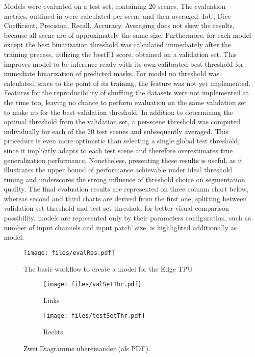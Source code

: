 {Models were evaluated on a test set, containing 20 scenes. The evaluation metrics, outlined in 
were calculated per scene and then averaged:
IoU, Dice Coefficient, Precision, Recall, Accuracy. Averaging does not skew the results, because all scene are of approximately the same size.
Furthermore, for each model except  the best binarization threshold was calculated immediately after the training precess,
utilizing the bestF1 score, obtained on a validation set.
This improves model to be inference-ready with its own calibrated best threshold for immediate binarization of predicted masks.
For  model no threshold was calculated, since to the point of its training, the feature was not yet implemented.
Features for the reproducibility of shuffling the datasets were not implemented at the time too,
leaving no chance to perform  evaluation on the same validation set to make up for the best validation threshold.
In addition to determining the optimal threshold from the validation set,
a per-scene threshold was computed individually for each of the 20 test scenes and subsequently averaged.
This procedure is even more optimistic than selecting a single global test threshold,
since it implicitly adapts to each test scene and therefore overestimates true generalization performance.
Nonetheless, presenting these results is useful, as it illustrates the upper bound of performance
achievable under ideal threshold tuning and underscores the strong influence of threshold choice on segmentation quality.
The final evaluation results are represented on three column chart below,
whereas second and third charts are derived from the first one, splitting between validation set threshold and test set threshold
for better visual comparison possibility.
 models are represented only by their parameters configuration, such as number of input channels and input patch' size,
 is highlighted additionally as  model. 

\begin{figure}[H]
  \centering
  \texttt{[image: files/evalRes.pdf]}
  \caption{The basic workflow to create a model for the Edge TPU}
  \label{fig:evalres}
\end{figure}

\begin{figure}[H]
  \centering
  \begin{subfigure}[t]{\textwidth}
    \centering
    \texttt{[image: files/valSetThr.pdf]}
    \caption{Links}
  \end{subfigure}
  \vspace{0.8em}
  \begin{subfigure}[t]{\textwidth}
    \centering
    \texttt{[image: files/testSetThr.pdf]}
    \caption{Rechts}
  \end{subfigure}
  \caption{Zwei Diagramme übereinander (als PDF).}
\end{figure}

}
